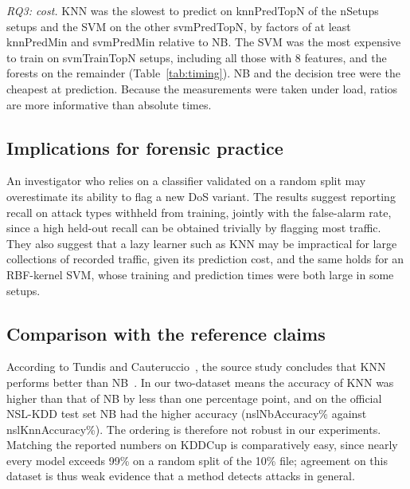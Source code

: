 \documentclass[conference]{IEEEtran}
\newcommand{\nm}[1]{\csname #1\endcsname}
\newcommand{\pc}[1]{\csname #1\endcsname\%}
\begin{document}
\emph{RQ3: cost.} KNN was the slowest to predict on \nm{knnPredTopN} of the \nm{nSetups} setups and the SVM on the other \nm{svmPredTopN}, by factors of at least \nm{knnPredMin} and \nm{svmPredMin} relative to NB. The SVM was the most expensive to train on \nm{svmTrainTopN} setups, including all those with 8 features, and the forests on the remainder (Table~\ref{tab:timing}). NB and the decision tree were the cheapest at prediction. Because the measurements were taken under load, ratios are more informative than absolute times.

\subsection{Implications for forensic practice}
An investigator who relies on a classifier validated on a random split may overestimate its ability to flag a new DoS variant. The results suggest reporting recall on attack types withheld from training, jointly with the false-alarm rate, since a high held-out recall can be obtained trivially by flagging most traffic. They also suggest that a lazy learner such as KNN may be impractical for large collections of recorded traffic, given its prediction cost, and the same holds for an RBF-kernel SVM, whose training and prediction times were both large in some setups.

\subsection{Comparison with the reference claims}
According to Tundis and Cauteruccio~\cite{tundis2025}, the source study concludes that KNN performs better than NB~\cite{kachavimath2020}. In our two-dataset means the accuracy of KNN was higher than that of NB by less than one percentage point, and on the official NSL-KDD test set NB had the higher accuracy (\pc{nslNbAccuracy} against \pc{nslKnnAccuracy}). The ordering is therefore not robust in our experiments. Matching the reported numbers on KDDCup is comparatively easy, since nearly every model exceeds 99\% on a random split of the 10\% file; agreement on this dataset is thus weak evidence that a method detects attacks in general.
\end{document}
